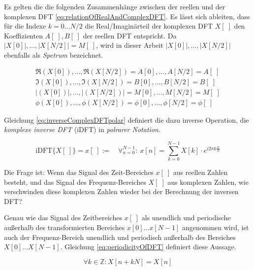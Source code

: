 Es gelten die die folgenden Zusammenhänge zwischen der reellen und der komplexen DFT \ref{eq:relationOfRealAndComplexDFT}. Es lässt sich ableiten, dass für die Indexe $k = 0 \ldots N/2$ die Real/Imaginärteil der komplexen DFT $X[\;]$ den Koeffizienten $A[\;],B[\;]$ der reellen DFT entspricht. Da $|X[0]|,\ldots,|X[N/2]| = M[\;]$, wird in dieser Arbeit $|X[0]|,\ldots,|X[N/2]|$ ebenfalls als \emph{Spetrum} bezeichnet. \cite[S. 225 - 226, 555]{dspGuide}

\begin{equation}
\begin{gathered}
\Re(X[0]) ,\ldots, \Re(X[N/2]) = A[0] ,\ldots, A[N/2] = A[\;] \\
\Im(X[0]) ,\ldots, \Im(X[N/2]) = B[0] ,\ldots, B[N/2] = B[\;]  \\
|(X[0])| ,\ldots, |(X[N/2])| = M[0] ,\ldots, M[N/2] = M[\;] \\
\phi(X[0]) ,\ldots, \phi(X[N/2]) = \phi[0] ,\ldots, \phi[N/2] = \phi[\;]
\end{gathered}
\label{eq:relationOfRealAndComplexDFT}
\end{equation}

Gleichung \ref{eq:inverseComplexDFTpolar} definiert die dazu inverse Operation, die \emph{komplexe inverse DFT} (iDFT) in \emph{polrarer Notation}. \cite[S. 572]{dspGuide}

\begin{equation}
\label{eq:inverseComplexDFTpolar}
\text{iDFT}\{X[\;]\} = x[\;] := \quad \mathop{\forall}_{n = 0}^{N-1} :\ x[n] = \sum_{k = 0}^{N-1}  X[k] \cdot e^{i 2\pi k \frac{n}{N}}
\end{equation}


Die Frage ist: Wenn das Signal des Zeit-Bereiches $x[\;]$  aus reellen Zahlen besteht, und das Signal des Frequenz-Bereiches $X[\;]$ aus komplexen Zahlen, wie \glqq verschwinden \grqq{} diese komplexen Zahlen wieder bei der Berechnung der inversen DFT? 

Genau wie das Signal des Zeitbereiches $x[\;]$ als unendlich und periodische außerhalb des transformierten Bereiches $x[0] \ldots x[N-1]$ angenommen wird, ist auch der Frequenz-Bereich unendlich und periodisch außerhalb des Bereiches $X[0] \ldots X[N-1] $. Gleichung  \ref{eq:periodicityOfDFT}  definiert diese Aussage. \cite[S. 572]{dspGuide}

\begin{equation}
\label{eq:periodicityOfDFT}
\forall k \in \mathbb{Z}: X[n+kN] = X[n]
\end{equation}

